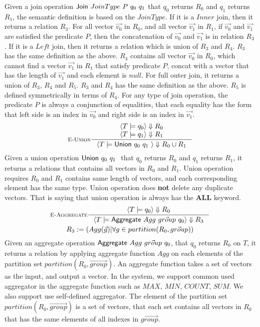 %
Given a join operation $\textsf{Join}~JoinType~P~q_0~q_1$ that $q_0$ returns $R_0$ and $q_1$ returns $R_1$, the semantic definition is based on the $JoinType$.
%
If it is a $Inner$ join, then it returns a relation $R_3$.
%
For all vector $\vec{v_0}$ in $R_0$, and all vector $\vec{v_1}$ in $R_1$, if $\vec{v_0}$ and
$\vec{v_1}$ are satisfied the predicate $P$, then the concatenation of $\vec{v_0}$ and $\vec{v_1}$ is in relation $R_3$.
%
If it is a $Left$ join, then it returns a relation which is union of $R_3$ and $R_4$.
%
$R_3$ has the same definition as the above.
%
$R_4$ contains all vector $\vec{v_0}$ in $R_0$, which cannot find a vector $\vec{v_1}$ in $R_1$ that satisfy predicate $P$, concat with a vector that has 
the length of $\vec{v_1}$ and each element is $null$.
%
For full outer join, it returns a union of $R_3$, $R_4$ and $R_5$.
%
$R_3$ and $R_4$ has the same definition as the above.
%
$R_5$ is defined symmetrically in terms of $R_4$.
%
For any type of join operation, the predicate $P$ is always a conjunction of equalities, that each equality has the form that left side is an index in 
$\vec{v_0}$ and right side is an index in $\vec{v_1}$.
%
\begin{gather*} 
  \inference[$\textsc{E-Union}$]{%
   \evaluation{T}{q_0}{R_0}\\
   \evaluation{T}{q_1}{R_1}\\
  }{%
  \evaluation{T}{\SUnion{q_0}{q_1}}{R_0 \cup R_1}
  }
\end{gather*}
%
Given a union operation $\textsf{Union}~q_0~q_1~$ that $q_0$ returns $R_0$ and $q_1$ returns $R_1$, it returns a relations that contains all vectors in $R_0$ and 
$R_1$.
%
Union operation requires $R_0$ and $R_1$ contains same length of vectors, and each corresponding element has the same type.
%
Union operation does \textbf{not} delete any duplicate vectors.
%
That is saying that union operation is always has the \textbf{ALL} keyword.
\begin{gather*}
  \inference[$\textsc{E-Aggregate}$]{%
   \evaluation{T}{q_0}{R_0}\\
  }{%
  \evaluation{T}{\SAggregate{Agg}{\vec{group}}{q_0}}{R_3}
  }
  \\
  R_3 := (Agg(\vec{g}) | \forall g \in partition(R_0,\vec{group}))
\end{gather*}
%
Given an aggregate operation $\textsf{Aggregate}~Agg~\vec{group}~q_0$, that $q_0$ returns $R_0$ on $T$, it returns a relation by applying 
aggregate function $Agg$ on each elements of the partition set $partition(R_0,\vec{group})$.
%
An aggregate function takes a set of vectors as the input, and output a vector.
%
In the system, we support common used aggregator in the aggregate function such as $MAX$, $MIN$, $COUNT$, $SUM$.
%
We also support use self-defined aggregator.
%
The element of the partition set $partition(R_0,\vec{group})$ is a set of vectors, that each set contains all vectors in $R_0$ that has the same 
elements of all indexes in $\vec{group}$.


